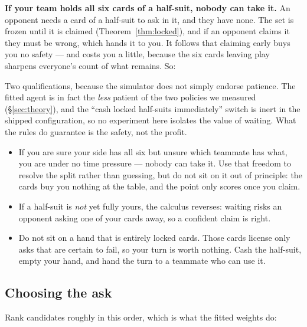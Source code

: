 \textbf{If your team holds all six cards of a half-suit, nobody can take it.} An
opponent needs a card of a half-suit to ask in it, and they have none. The set is
frozen until it is claimed (Theorem~\ref{thm:locked}), and if an opponent claims
it they must be wrong, which hands it to you. It follows that claiming early
buys you no safety --- and costs you a little, because the six cards leaving play
sharpens everyone's count of what remains. So:

Two qualifications, because the simulator does not simply endorse patience. The
fitted agent is in fact the \emph{less} patient of the two policies we measured
(\S\ref{sec:theory}), and the ``cash locked half-suits immediately'' switch is
inert in the shipped configuration, so no experiment here isolates the value of
waiting. What the rules do guarantee is the safety, not the profit.

\begin{itemize}
  \item If you are sure your side has all six but unsure which teammate has what,
        you are under no time pressure --- nobody can take it. Use that freedom
        to resolve the split rather than guessing, but do not sit on it out of
        principle: the cards buy you nothing at the table, and the point only
        scores once you claim.
  \item If a half-suit is \emph{not} yet fully yours, the calculus reverses:
        waiting risks an opponent asking one of your cards away, so a confident
        claim is right.
  \item Do not sit on a hand that is entirely locked cards. Those cards license
        only asks that are certain to fail, so your turn is worth nothing.
        Cash the half-suit, empty your hand, and hand the turn to a teammate who
        can use it.
\end{itemize}

\subsection{Choosing the ask}

Rank candidates roughly in this order, which is what the fitted weights do:

